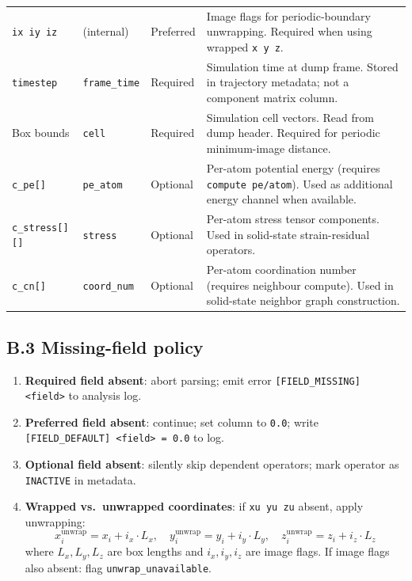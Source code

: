 \documentclass[11pt, a4paper, oneside]{article}
\begin{document}
\begin{appendices}
\begin{longtable}{p{2.2cm} p{2.5cm} p{1.8cm} p{7.1cm}}
  \texttt{ix iy iz} & (internal)           & Preferred &
	Image flags for periodic-boundary unwrapping.
	Required when using wrapped \texttt{x y z}. \\

  \texttt{timestep} & \texttt{frame\_time}  & Required &
	Simulation time at dump frame. Stored in trajectory metadata;
	not a component matrix column. \\

  Box bounds        & \texttt{cell}         & Required &
	Simulation cell vectors. Read from dump header.
	Required for periodic minimum-image distance. \\

  \midrule

  \texttt{c\_pe[]}  & \texttt{pe\_atom}     & Optional &
	Per-atom potential energy (requires \texttt{compute pe/atom}).
	Used as additional energy channel when available. \\

  \texttt{c\_stress[][]} & \texttt{stress}  & Optional &
	Per-atom stress tensor components.
	Used in solid-state strain-residual operators. \\

  \texttt{c\_cn[]}  & \texttt{coord\_num}   & Optional &
	Per-atom coordination number (requires neighbour compute).
	Used in solid-state neighbor graph construction. \\

  \bottomrule
\end{longtable}

\subsection*{B.3 Missing-field policy}

\begin{enumerate}
  \item \textbf{Required field absent}: abort parsing; emit error
	\texttt{[FIELD\_MISSING] <field>} to analysis log.
  \item \textbf{Preferred field absent}: continue; set column to
	\texttt{0.0}; write \texttt{[FIELD\_DEFAULT] <field> = 0.0} to log.
  \item \textbf{Optional field absent}: silently skip dependent
	operators; mark operator as \texttt{INACTIVE} in metadata.
  \item \textbf{Wrapped vs.\ unwrapped coordinates}: if
	\texttt{xu yu zu} absent, apply unwrapping:
	\[
	  x_i^{\mathrm{unwrap}} = x_i + i_x \cdot L_x, \quad
	  y_i^{\mathrm{unwrap}} = y_i + i_y \cdot L_y, \quad
	  z_i^{\mathrm{unwrap}} = z_i + i_z \cdot L_z
	\]
	where $L_x, L_y, L_z$ are box lengths and
	$i_x, i_y, i_z$ are image flags.
	If image flags also absent: flag \texttt{unwrap\_unavailable}.
\end{enumerate}


\end{appendices}
\end{document}
